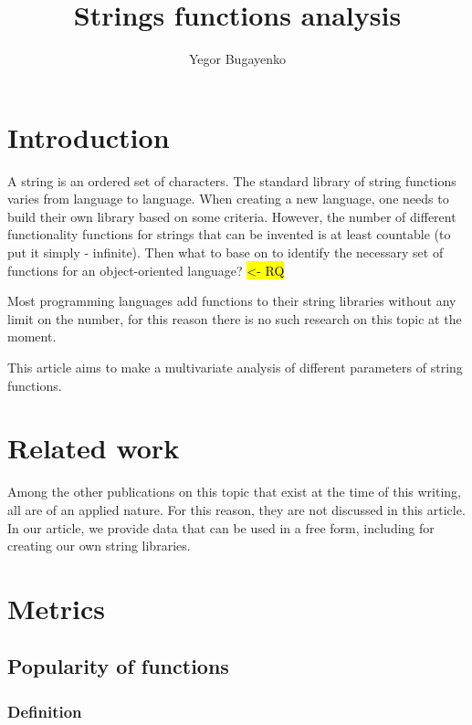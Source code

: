 \documentclass[anonymous,sigplan,review,11pt,nonacm,natbib=false]{acmart}
\title{Strings functions analysis}
\author{Yegor Bugayenko}
\affiliation{Huawei\city{Moscow}\country{Russia}}
\begin{document}
    \raggedbottom

    \begin{abstract}
    \end{abstract}

    \maketitle

    \section{Introduction}\label{sec:intro}

    A string is an ordered set of characters. The standard library of string functions varies from language to language. When creating a new language, one needs to build their own library based on some criteria. However, the number of different functionality functions for strings that can be invented is at least countable (to put it simply - infinite). Then what to base on to identify the necessary set of functions for an object-oriented language? \hl{<- RQ}

    Most programming languages add functions to their string libraries without any limit on the number, for this reason there is no such research on this topic at the moment.

    This article aims to make a multivariate analysis of different parameters of string functions.

    \section{Related work}

    Among the other publications on this topic that exist at the time of this writing, all are of an applied nature. For this reason, they are not discussed in this article. In our article, we provide data that can be used in a free form, including for creating our own string libraries.

    \section{Metrics}

    \subsection{Popularity of functions}

    \subsubsection{Definition}
\end{document}
